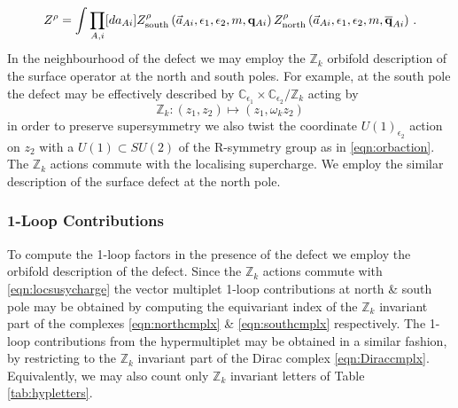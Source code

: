 \documentclass[main.tex]{subfiles}
\begin{document}
\begin{equation}\label{eqn:5dindexgenericdefect}
Z^{\rho}=\int\prod_{A,i}[da_{Ai}]Z^{\rho}_{\text{south}}\left(\vec{a}_{Ai},\epsilon_1,\epsilon_2,m,\mathbf{q}_{Ai}\right)Z^{\rho}_{\text{north}}\left(\vec{a}_{Ai},\epsilon_1,\epsilon_2,m,\overline{\mathbf{q}}_{Ai}\right)\,.
\end{equation}
In the neighbourhood of the defect we may employ the $\mathbb{Z}_k$ orbifold description of the surface operator at the north and south poles. For example, at the south pole the defect may be effectively described by $\mathbb{C}_{\epsilon_1}\times\mathbb{C}_{\epsilon_2}/\mathbb{Z}_k$ acting by
\begin{equation}
\mathbb{Z}_k:(z_1,z_2)\mapsto(z_1,\omega_kz_2)
\end{equation}
in order to preserve supersymmetry we also twist the coordinate $U(1)_{\epsilon_2}$ action on $z_2$ with a $U(1)\subset SU(2)$ of the R-symmetry group as in \eqref{eqn:orbaction}. The $\mathbb{Z}_k$ actions commute with the localising supercharge. We employ the similar description of the surface defect at the north pole. 
%
\subsubsection{1-Loop Contributions}
To compute the 1-loop factors in the presence of the defect we employ the orbifold description of the defect. Since the $\mathbb{Z}_k$ actions commute with \eqref{eqn:locsusycharge} the vector multiplet 1-loop contributions at north \& south pole may be obtained by computing the equivariant index of the $\mathbb{Z}_k$ invariant part of the complexes \eqref{eqn:northcmplx} \& \eqref{eqn:southcmplx} respectively. The 1-loop contributions from the hypermultiplet may be obtained in a similar fashion, by restricting to the $\mathbb{Z}_k$ invariant part of the Dirac complex \eqref{eqn:Diraccmplx}. Equivalently, we may also count only $\mathbb{Z}_k$ invariant letters of Table \ref{tab:hypletters}.
\end{document}
